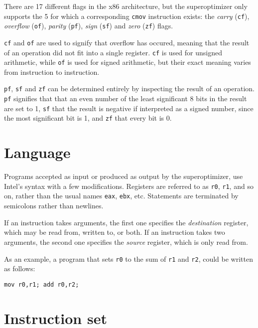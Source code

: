 \documentclass[a4paper,11pt]{kth-mag}
\begin{document}
There are 17 different flags in the x86 architecture, but the superoptimizer only supports the 5 for which a corresponding \verb|cmov| instruction exists:
the \emph{carry} (\verb|cf|), \emph{overflow} (\verb|of|), \emph{parity} (\verb|pf|), \emph{sign} (\verb|sf|) and \emph{zero} (\verb|zf|) flags.

\verb|cf| and \verb|of| are used to signify that overflow has occured, meaning that the result of an operation did not fit into a single register.
\verb|cf| is used for unsigned arithmetic, while \verb|of| is used for signed arithmetic, but their exact meaning varies from instruction to instruction.

\verb|pf|, \verb|sf| and \verb|zf| can be determined entirely by inspecting the result of an operation.
\verb|pf| signifies that that an even number of the least significant 8 bits in the result are set to 1,
\verb|sf| that the result is negative if interpreted as a signed number, since the most significant bit is 1,
and \verb|zf| that every bit is 0.

\section{Language}
\label{s:language}

Programs accepted as input or produced as output by the superoptimizer, use Intel's syntax with a few modifications.
Registers are referred to as \verb|r0|, \verb|r1|, and so on, rather than the usual names \verb|eax|, \verb|ebx|, etc.
Statements are terminated by semicolons rather than newlines.

If an instruction takes arguments, the first one specifies the \emph{destination} register, which may be read from, written to, or both.
If an instruction takes two arguments, the second one specifies the \emph{source} register, which is only read from.

As an example, a program that sets \verb|r0| to the sum of \verb|r1| and \verb|r2|, could be written as follows:

\begin{verbatim}
mov r0,r1; add r0,r2;
\end{verbatim}

\section{Instruction set}

\cite{x86_timing}
\end{document}
